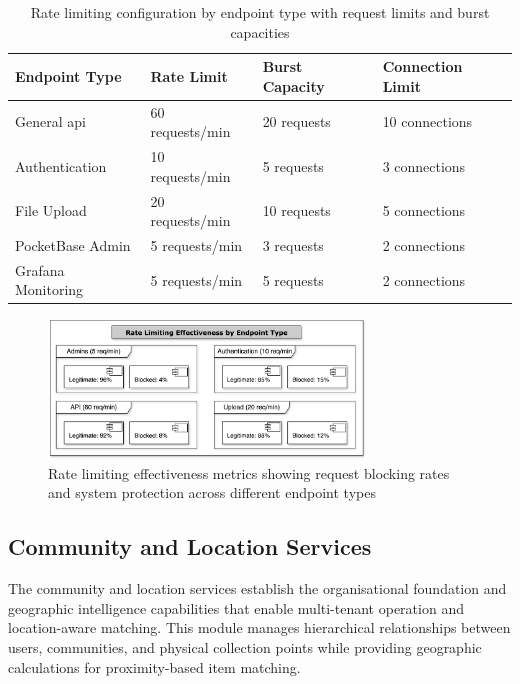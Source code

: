 \begin{table}[htbp]
    \centering
    \caption{Rate limiting configuration by endpoint type with request limits and burst capacities}
    \label{tab:rate_limiting_config}
    \begin{tabular}{@{}llll@{}}
        \toprule
        \textbf{Endpoint Type} & \textbf{Rate Limit} & \textbf{Burst Capacity} & \textbf{Connection Limit} \\
        \midrule
        General \ac{api} & 60 requests/min & 20 requests & 10 connections \\
        Authentication & 10 requests/min & 5 requests & 3 connections \\
        File Upload & 20 requests/min & 10 requests & 5 connections \\
        PocketBase Admin & 5 requests/min & 3 requests & 2 connections \\
        Grafana Monitoring & 5 requests/min & 5 requests & 2 connections \\
        \bottomrule
    \end{tabular}
\end{table}

\begin{figure}[htbp]
    \centering
    \includegraphics[width=0.75\textwidth]{figs/chapter4/rate_limiting_chart.png}
    \caption{Rate limiting effectiveness metrics showing request blocking rates and system protection across different endpoint types}
    \label{fig:rate_limiting_effectiveness}
\end{figure}

\subsection{Community and Location Services} \label{subsection:community_location_services}

The community and location services establish the organisational foundation and geographic intelligence capabilities that enable multi-tenant operation and location-aware matching. This module manages hierarchical relationships between users, communities, and physical collection points while providing geographic calculations for proximity-based item matching.

